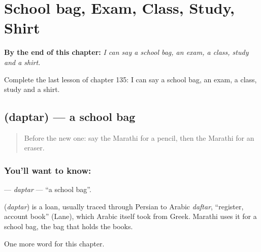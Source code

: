 
\chapter{School bag, Exam, Class, Study, Shirt}
\label{ch:mr-school-bag-exam-class-study-shirt}

\begin{chapteropening}
\textbf{By the end of this chapter:} \emph{I can say a school bag, an exam, a class, study and a shirt.}

Complete the last lesson of chapter 135: I can say a school bag, an exam, a class, study and a shirt.
\end{chapteropening}

\section[\texorpdfstring{\mr{दप्तर} (daptar)}{दप्तर (daptar)}]{ (daptar) — a school bag}

\label{lesson:MR-C135-daptar}



\begin{quote}
Before the new one: say the Marathi for a pencil, then the Marathi for an eraser.
\end{quote}

\subsection*{You'll want to know: }
\textbf{} — \emph{daptar} — \textquotedblleft{}a school bag\textquotedblright{}.

\begin{cousinweb}
\textbf{} (\emph{daptar}) is a loan, usually traced through Persian to Arabic \emph{daftar}, \textquotedblleft{}register, account book\textquotedblright{} (Lane), which Arabic itself took from Greek. Marathi uses it for a school bag, the bag that holds the books.
\end{cousinweb}

\begin{grammarlens}[title={What you've built}]
One more word for this chapter.
\end{grammarlens}

